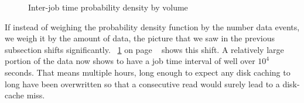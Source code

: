 \begin{figure}
\centering
{}
\hspace{0mm}
\caption{Inter-job time probability density by volume}
\label{fig:InterJobBySize}
\end{figure}
If instead of weighing the probability density function by the number data events, we weigh it by the amount of data, the picture that we saw in the previous subsection shifts significantly. ~\ref{fig:InterJobBySize} on page ~\pageref{fig:InterJobBySize} shows this shift. A relatively large portion of the data now shows to have a job time interval of well over $10^4$ seconds. That means multiple hours, long enough to expect any disk caching to long have been overwritten so that a consecutive read would surely lead to a disk-cache miss.
